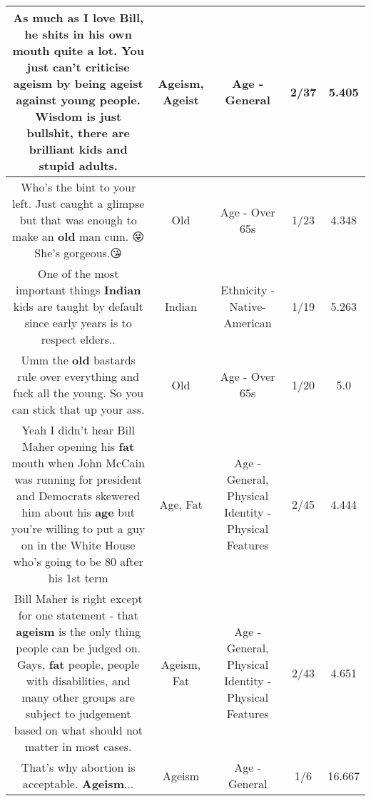 \documentclass[11pt]{article}
\newlength\mylength
\begin{document}
\begin{center}
\begin{longtable}{|C{.65\mylength}|C{.30\mylength}|C{.12\mylength}|C{.12\mylength}|C{.12\mylength}|}
  \small As much as I love Bill, he shits in his own mouth quite a lot. You just can't criticise \textbf{ageism} by being \textbf{ageist} against young people. Wisdom is just bullshit, there are brilliant kids and stupid adults.\normalsize   & Ageism, Ageist & Age - General & 2/37 & 5.405 \\  \hline
  \small Who's the bint to your left. Just caught a glimpse but that was enough to make an \textbf{old} man cum. 😜She's gorgeous.😘\normalsize   & Old & Age - Over 65s & 1/23 & 4.348 \\  \hline
  \small One of the most important things \textbf{Indian} kids are taught by default since early years is to respect elders..\normalsize   & Indian & Ethnicity - Native-American & 1/19 & 5.263 \\  \hline
  \small Umm the \textbf{old} bastards rule over everything and fuck all the young. So you can stick that up your ass.\normalsize   & Old & Age - Over 65s & 1/20 & 5.0 \\  \hline
  \small Yeah I didn't hear Bill Maher opening his \textbf{fat} mouth when John McCain was running for president and Democrats skewered him about his \textbf{age} but you're willing to put a guy on in the White House who's going to be 80 after his 1st term\normalsize   & Age, Fat & Age - General, Physical Identity - Physical Features & 2/45 & 4.444 \\  \hline
  \small Bill Maher is right except for one statement - that \textbf{ageism} is the only thing people can be judged on.  Gays, \textbf{fat} people, people with disabilities, and many other groups are subject to judgement based on what should not matter in most cases.\normalsize   & Ageism, Fat & Age - General, Physical Identity - Physical Features & 2/43 & 4.651 \\  \hline
  \small That's why abortion is acceptable.  \textbf{Ageism}...\normalsize   & Ageism & Age - General & 1/6 & 16.667 \\  \hline

\end{longtable}
\end{center}
\end{document}
